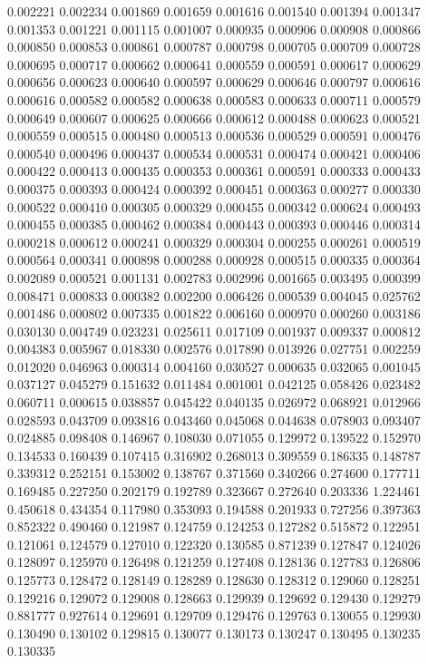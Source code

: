 0.002221
0.002234
0.001869
0.001659
0.001616
0.001540
0.001394
0.001347
0.001353
0.001221
0.001115
0.001007
0.000935
0.000906
0.000908
0.000866
0.000850
0.000853
0.000861
0.000787
0.000798
0.000705
0.000709
0.000728
0.000695
0.000717
0.000662
0.000641
0.000559
0.000591
0.000617
0.000629
0.000656
0.000623
0.000640
0.000597
0.000629
0.000646
0.000797
0.000616
0.000616
0.000582
0.000582
0.000638
0.000583
0.000633
0.000711
0.000579
0.000649
0.000607
0.000625
0.000666
0.000612
0.000488
0.000623
0.000521
0.000559
0.000515
0.000480
0.000513
0.000536
0.000529
0.000591
0.000476
0.000540
0.000496
0.000437
0.000534
0.000531
0.000474
0.000421
0.000406
0.000422
0.000413
0.000435
0.000353
0.000361
0.000591
0.000333
0.000433
0.000375
0.000393
0.000424
0.000392
0.000451
0.000363
0.000277
0.000330
0.000522
0.000410
0.000305
0.000329
0.000455
0.000342
0.000624
0.000493
0.000455
0.000385
0.000462
0.000384
0.000443
0.000393
0.000446
0.000314
0.000218
0.000612
0.000241
0.000329
0.000304
0.000255
0.000261
0.000519
0.000564
0.000341
0.000898
0.000288
0.000928
0.000515
0.000335
0.000364
0.002089
0.000521
0.001131
0.002783
0.002996
0.001665
0.003495
0.000399
0.008471
0.000833
0.000382
0.002200
0.006426
0.000539
0.004045
0.025762
0.001486
0.000802
0.007335
0.001822
0.006160
0.000970
0.000260
0.003186
0.030130
0.004749
0.023231
0.025611
0.017109
0.001937
0.009337
0.000812
0.004383
0.005967
0.018330
0.002576
0.017890
0.013926
0.027751
0.002259
0.012020
0.046963
0.000314
0.004160
0.030527
0.000635
0.032065
0.001045
0.037127
0.045279
0.151632
0.011484
0.001001
0.042125
0.058426
0.023482
0.060711
0.000615
0.038857
0.045422
0.040135
0.026972
0.068921
0.012966
0.028593
0.043709
0.093816
0.043460
0.045068
0.044638
0.078903
0.093407
0.024885
0.098408
0.146967
0.108030
0.071055
0.129972
0.139522
0.152970
0.134533
0.160439
0.107415
0.316902
0.268013
0.309559
0.186335
0.148787
0.339312
0.252151
0.153002
0.138767
0.371560
0.340266
0.274600
0.177711
0.169485
0.227250
0.202179
0.192789
0.323667
0.272640
0.203336
1.224461
0.450618
0.434354
0.117980
0.353093
0.194588
0.201933
0.727256
0.397363
0.852322
0.490460
0.121987
0.124759
0.124253
0.127282
0.515872
0.122951
0.121061
0.124579
0.127010
0.122320
0.130585
0.871239
0.127847
0.124026
0.128097
0.125970
0.126498
0.121259
0.127408
0.128136
0.127783
0.126806
0.125773
0.128472
0.128149
0.128289
0.128630
0.128312
0.129060
0.128251
0.129216
0.129072
0.129008
0.128663
0.129939
0.129692
0.129430
0.129279
0.881777
0.927614
0.129691
0.129709
0.129476
0.129763
0.130055
0.129930
0.130490
0.130102
0.129815
0.130077
0.130173
0.130247
0.130495
0.130235
0.130335
